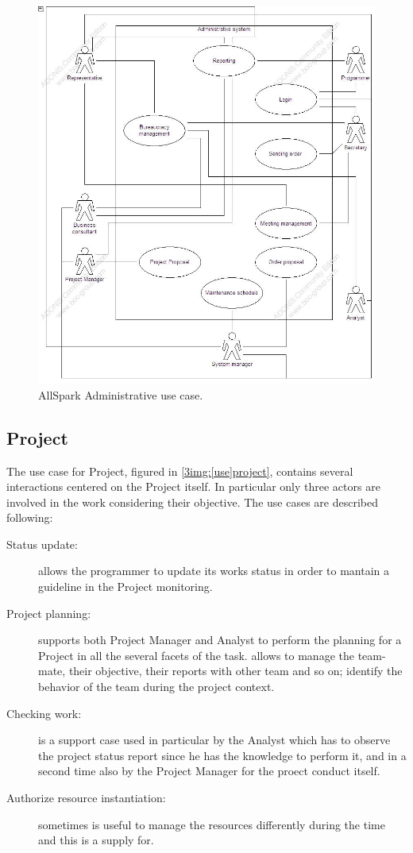 \begin{figure}
\begin{centering}
\includegraphics[scale=0.35]{assign3/adonis/imgs/administrative.jpg}
\caption{AllSpark Administrative use case.}
\label{3img:[use]administrative}
\end{centering}
\end{figure}


\subsection{Project}
The use case for Project, figured in \ref{3img:[use]project}, contains several interactions centered on the Project itself. In particular only three actors are involved in the work considering their objective.
The use cases are described following:
\begin{description}
\item[Status update:] allows the programmer to update its works status in order to mantain a guideline in the Project monitoring.
\item[Project planning:] supports both Project Manager and Analyst to perform the planning for a Project in all the several facets of the task.
 allows to manage the team-mate, their objective, their reports with other team and so on;
 identify the behavior of the team during the project context.
\item[Checking work:] is a support case used in particular by the Analyst which has to observe the project status report since he has the knowledge to perform it, and in a second time also by the Project Manager for the proect conduct itself.
\item[Authorize resource instantiation:] sometimes is useful to manage the resources differently during the time and this is a supply for.
\end{description}


